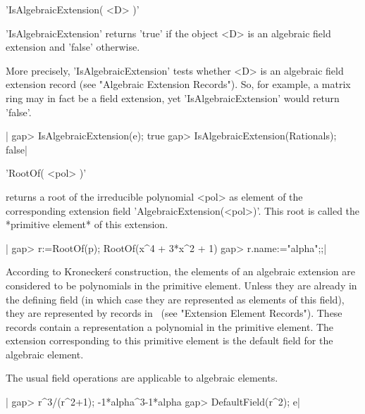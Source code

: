 
'IsAlgebraicExtension( <D> )'

'IsAlgebraicExtension' returns 'true' if the object <D> is an algebraic
field extension and 'false' otherwise.

More  precisely, 'IsAlgebraicExtension'  tests whether  <D> is an algebraic
field  extension  record  (see  "Algebraic  Extension  Records").  So,  for
example,   a  matrix   ring  may   in  fact   be  a  field  extension,  yet
'IsAlgebraicExtension' would return 'false'.

|    gap> IsAlgebraicExtension(e);
    true
    gap> IsAlgebraicExtension(Rationals);
    false|


'RootOf( <pol> )'

returns a root of the irreducible polynomial <pol> as element of the
corresponding extension field 'AlgebraicExtension(<pol>)'.  This root is
called the *primitive element* of this extension.


|    gap> r:=RootOf(p);
    RootOf(x^4 + 3*x^2 + 1)
    gap> r.name:="alpha";;|


According  to  Kronecker\'s  construction,  the  elements  of  an algebraic
extension are considered to be polynomials in the primitive element. Unless
they  are already in the defining field (in which case they are represented
as  elements of this field), they are  represented by records in \GAP\ (see
"Extension  Element  Records").  These  records  contain a representation a
polynomial  in the primitive  element. The extension  corresponding to this
primitive element is the default field for the algebraic element.

The usual field operations are applicable to algebraic elements.

|    gap> r^3/(r^2+1);
    -1*alpha^3-1*alpha
    gap> DefaultField(r^2);
    e|



